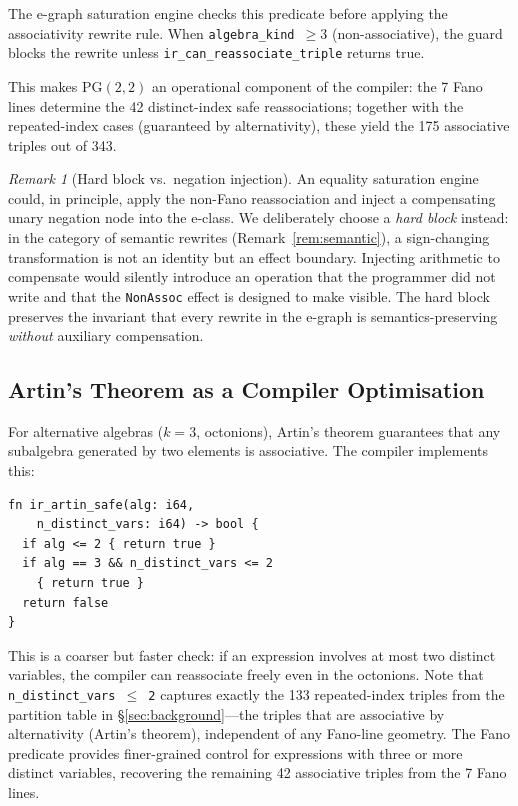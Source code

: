 \documentclass[11pt,a4paper]{article}
\theoremstyle{definition}
\theoremstyle{remark}
\newtheorem{remark}[theorem]{Remark}
\newcommand{\PG}{\mathrm{PG}}
\begin{document}
The e-graph saturation engine checks this predicate before applying
the associativity rewrite rule. When \texttt{algebra\_kind $\geq 3$}
(non-associative), the guard blocks the rewrite unless
\texttt{ir\_can\_reassociate\_triple} returns true.

This makes $\PG(2,2)$ an operational component of the compiler: the
7 Fano lines determine the 42 distinct-index safe reassociations;
together with the repeated-index cases (guaranteed by alternativity),
these yield the 175 associative triples out of 343.

\begin{remark}[Hard block vs.\ negation injection]
An equality saturation engine could, in principle, apply the
non-Fano reassociation and inject a compensating unary negation
node into the e-class. We deliberately choose a \emph{hard block}
instead: in the category of semantic rewrites (Remark~\ref{rem:semantic}),
a sign-changing transformation is not an identity but an effect
boundary. Injecting arithmetic to compensate would silently
introduce an operation that the programmer did not write and that
the \texttt{NonAssoc} effect is designed to make visible. The hard
block preserves the invariant that every rewrite in the e-graph is
semantics-preserving \emph{without} auxiliary compensation.
\end{remark}

\subsection{Artin's Theorem as a Compiler Optimisation}

For alternative algebras ($k = 3$, octonions), Artin's theorem
guarantees that any subalgebra generated by two elements is
associative. The compiler implements this:

\begin{lstlisting}[language=Sounio]
fn ir_artin_safe(alg: i64,
    n_distinct_vars: i64) -> bool {
  if alg <= 2 { return true }
  if alg == 3 && n_distinct_vars <= 2
    { return true }
  return false
}
\end{lstlisting}

This is a coarser but faster check: if an expression involves at most
two distinct variables, the compiler can reassociate freely even in the
octonions. Note that \texttt{n\_distinct\_vars $\leq$ 2} captures
exactly the 133 repeated-index triples from the partition table in
\S\ref{sec:background}---the triples that are associative by
alternativity (Artin's theorem), independent of any Fano-line
geometry. The Fano predicate provides finer-grained control for
expressions with three or more distinct variables, recovering the
remaining 42 associative triples from the 7 Fano lines.
\end{document}
